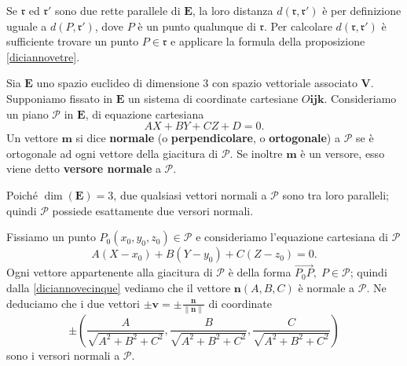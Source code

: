 \documentclass{article}
\theoremstyle{plain}
\theoremstyle{definition}
\theoremstyle{remark}
\begin{document}
\vspace{10pt}

Se $\mathfrak{r}$ ed $\mathfrak{r}'$ sono due rette parallele di $\mathbf{E}$, la loro distanza 
$d(\mathfrak{r}, \mathfrak{r}')$ è per definizione uguale a $d(P, \mathfrak{r}')$, dove $P$ è un punto 
qualunque di $\mathfrak{r}$. 
Per calcolare $d(\mathfrak{r}, \mathfrak{r}')$ è sufficiente trovare un punto $P \in \mathfrak{r}$ e 
applicare la formula della proposizione \ref{diciannovetre}.

\vspace{10pt}

Sia $\mathbf{E}$ uno spazio euclideo di dimensione $3$ con spazio vettoriale associato $\mathbf{V}$. 
Supponiamo fissato in $\mathbf{E}$ un sistema di coordinate cartesiane $O\mathbf{ijk}$.
Consideriamo un piano $\mathscr{P}$ in $\mathbf{E}$, di equazione cartesiana
\begin{equation}\label{diciannovequattro}
AX + BY + CZ + D = 0.    
\end{equation}
Un vettore $\mathbf{m}$ si dice \textbf{normale} (o \textbf{perpendicolare}, o \textbf{ortogonale}) a 
$\mathscr{P}$ se è ortogonale ad ogni vettore della giacitura di $\mathscr{P}$. 
Se inoltre $\mathbf{m}$ è un versore, esso viene detto \textbf{versore normale} a $\mathscr{P}$.

\vspace{10pt}

Poiché $\dim(\mathbf{E}) = 3$, due qualsiasi vettori normali a $\mathscr{P}$ sono tra loro paralleli; 
quindi $\mathscr{P}$ possiede esattamente due versori normali.

\vspace{10pt}

Fissiamo un punto $P_0(x_0, y_0, z_0) \in \mathscr{P}$ e consideriamo l'equazione cartesiana di $\mathscr{P}$
\begin{equation}\label{diciannovecinque}
A(X - x_0) + B(Y - y_0) + C(Z - z_0) = 0.    
\end{equation}
Ogni vettore appartenente alla giacitura di $\mathscr{P}$ è della forma 
$\overrightarrow{P_0P},\; P \in \mathscr{P}$; quindi dalla \ref{diciannovecinque} vediamo che il vettore 
$\mathbf{n}(A, B, C)$ è normale a $\mathscr{P}$. Ne deduciamo che i due vettori 
$\pm \mathbf{v} = \pm \frac{\mathbf{n}}{\|\mathbf{n}\|}$ di coordinate
\[
\pm \left( \frac{A}{\sqrt{A^2 + B^2 + C^2}}, 
\frac{B}{\sqrt{A^2 + B^2 + C^2}}, 
\frac{C}{\sqrt{A^2 + B^2 + C^2}} \right)
\]
sono i versori normali a $\mathscr{P}$.
\end{document}
